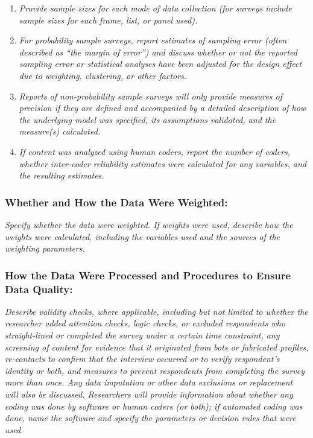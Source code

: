 \documentclass{article}
\begin{document}
\begin{enumerate}

    \item \textit{Provide sample sizes for each mode of data collection (for
              surveys include sample sizes for each frame, list, or panel used).}

    \item \textit{For probability sample surveys, report estimates of sampling
              error (often described as ``the margin of error'') and discuss whether or not
              the reported sampling error or statistical analyses have been adjusted for the
              design effect due to weighting, clustering, or other factors.}

    \item \textit{Reports of non-probability sample surveys will only provide
              measures of precision if they are defined and accompanied by a detailed
              description of how the underlying model was specified, its assumptions
              validated, and the measure(s) calculated.}

    \item \textit{If content was analyzed using human coders, report the number of
              coders, whether inter-coder reliability estimates were calculated for any
              variables, and the resulting estimates.}

\end{enumerate}

\subsubsection*{Whether and How the Data Were Weighted:} \textit{Specify
    whether the data were weighted. If weights were used, describe how the weights
    were calculated, including the variables used and the sources of the weighting
    parameters.}

\subsubsection*{How the Data Were Processed and Procedures to Ensure Data
    Quality:} \textit{Describe validity checks, where applicable, including but not
    limited to whether the researcher added attention checks, logic checks, or
    excluded respondents who straight-lined or completed the survey under a certain
    time constraint, any screening of content for evidence that it originated from
    bots or fabricated profiles, re-contacts to confirm that the interview occurred
    or to verify respondent's identity or both, and measures to prevent respondents
    from completing the survey more than once. Any data imputation or other data
    exclusions or replacement will also be discussed. Researchers will provide
    information about whether any coding was done by software or human coders (or
    both); if automated coding was done, name the software and specify the
    parameters or decision rules that were used.}
\end{document}
